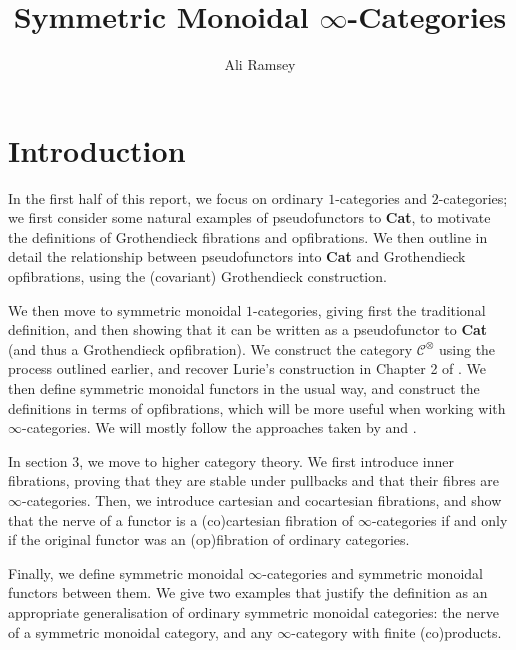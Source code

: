 \documentclass{MetricNotes2023}
\author{Ali Ramsey}
\title{Symmetric Monoidal \(\infty\)-Categories}
\date{\vspace{-5ex}}
\begin{document}
\maketitle
%

\DeclarePairedDelimiter{\norm}{\lVert}{\rVert} 
\DeclarePairedDelimiter{\abs}{\lvert}{\rvert} 
\DeclarePairedDelimiter{\ang}{\langle}{\rangle} 

\section{Introduction}

In the first half of this report, we focus on ordinary \(1\)-categories and \(2\)-categories; we first consider some natural examples of pseudofunctors to \textbf{Cat}, to motivate the definitions of Grothendieck fibrations and opfibrations. We then outline in detail the relationship between pseudofunctors into \textbf{Cat} and Grothendieck opfibrations, using the (covariant) Grothendieck construction.

We then move to symmetric monoidal \(1\)-categories, giving first the traditional definition, and then showing that it can be written as a pseudofunctor to \textbf{Cat} (and thus a Grothendieck opfibration). We construct the category \(\mathcal{C}^\otimes\) using the process outlined earlier, and recover Lurie's construction in Chapter 2 of \autocite{higheralgebra}. We then define symmetric monoidal functors in the usual way, and construct the definitions in terms of opfibrations, which will be more useful when working with \(\infty\)-categories. We will mostly follow the approaches taken by \autocite{symmetricmonoidal} and \autocite{groth2015short}. 

In section 3, we move to higher category theory. We first introduce inner fibrations, proving that they are stable under pullbacks and that their fibres are \(\infty\)-categories. Then, we introduce cartesian and cocartesian fibrations, and show that the nerve of a functor is a (co)cartesian fibration of \(\infty\)-categories if and only if the original functor was an (op)fibration of ordinary categories. 

Finally, we define symmetric monoidal \(\infty\)-categories and symmetric monoidal functors between them. We give two examples that justify the definition as an appropriate generalisation of ordinary symmetric monoidal categories: the nerve of a symmetric monoidal category, and any \(\infty\)-category with finite (co)products. 
\end{document}
